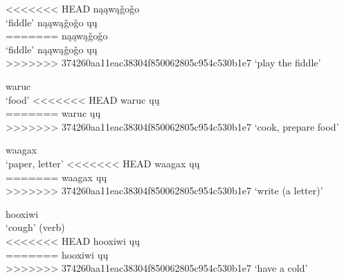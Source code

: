 \documentclass[output=paper]{LSP/langsci}
\begin{document}
\begin{exe}
\ex
\begin{multicols}{2}
\begin{xlist}
\ex
<<<<<<< HEAD
nąąwą\v{g}o\v{g}o\\
`fiddle'
\ex
nąąwą\v{g}o\v{g}o ųų\\
=======
n\k{a}\k{a}w\k{a}\v{g}o\v{g}o\\
`fiddle'
\ex
n\k{a}\k{a}w\k{a}\v{g}o\v{g}o \k{u}\k{u}\\
>>>>>>> 374260aa11eac38304f850062805c954c530b1e7
`play the fiddle'
\end{xlist}
\end{multicols}
\end{exe}

\begin{exe}
\ex
\begin{multicols}{2}
\begin{xlist}
\ex
waruc\\
`food'
\ex
<<<<<<< HEAD
waruc ųų\\
=======
waruc \k{u}\k{u}\\
>>>>>>> 374260aa11eac38304f850062805c954c530b1e7
`cook, prepare food'
\end{xlist}
\end{multicols}
\end{exe}

\begin{exe}
\ex
\begin{multicols}{2}
\begin{xlist}
\ex
waagax\\
`paper, letter'
\ex
<<<<<<< HEAD
waagax ųų\\
=======
waagax \k{u}\k{u}\\
>>>>>>> 374260aa11eac38304f850062805c954c530b1e7
`write (a letter)'
\end{xlist}
\end{multicols}
\end{exe}

\pagebreak
\begin{exe}
\ex
\begin{multicols}{2}
\begin{xlist}
\ex
hooxiwi\\
`cough' (verb)\\

\ex
<<<<<<< HEAD
hooxiwi ųų\\
=======
hooxiwi \k{u}\k{u}\\
>>>>>>> 374260aa11eac38304f850062805c954c530b1e7
`have a cold'
\end{xlist}
\end{multicols}
\end{exe}
\end{document}
